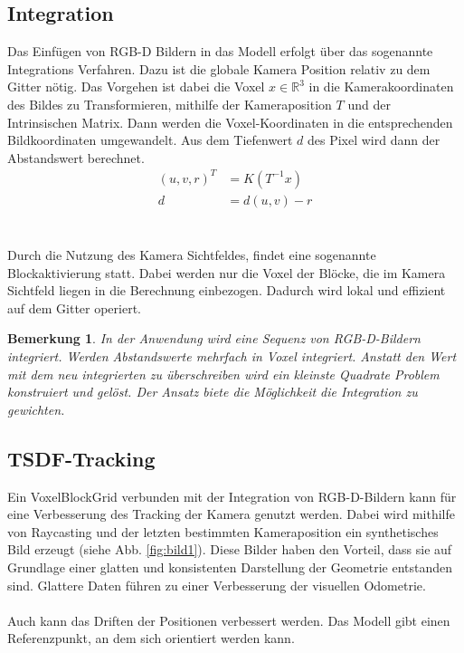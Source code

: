 \documentclass[12pt,DIV=15,BCOR=15mm,twoside,headsepline,abstract=true,listof=totoc,bibliography=totoc]{scrreprt}
\newtheorem{remark}{Bemerkung}[chapter]
\theoremstyle{remark}    %
\begin{document}
    \subsection{Integration}
    \label{sec:integration}
    Das Einfügen von \ac{RGB-D} Bildern in das Modell erfolgt über das sogenannte Integrations Verfahren. Dazu ist die globale Kamera Position relativ zu dem 
    Gitter nötig. Das Vorgehen ist dabei die Voxel $x\in \mathbb{R}^3$ in die Kamerakoordinaten des Bildes zu Transformieren, mithilfe der Kameraposition $T$ 
    und der Intrinsischen Matrix. Dann werden die Voxel-Koordinaten in die entsprechenden Bildkoordinaten umgewandelt. Aus dem Tiefenwert $d$ des Pixel wird 
    dann der Abstandswert berechnet. \cite{dong2023ashmodernframeworkparallel}
    \begin{align}
        \left( u,v,r \right)^T & = K(T^{-1}x) \\
       d  &= d(u, v) -r
    \end{align} \\\\
    Durch die Nutzung des Kamera Sichtfeldes, findet eine sogenannte Blockaktivierung statt. Dabei werden nur die Voxel der Blöcke, die im Kamera Sichtfeld liegen
    in die Berechnung einbezogen. Dadurch wird lokal und effizient auf dem Gitter operiert.
    \begin{remark} \label{bem:weight_integration}
    In der Anwendung wird eine Sequenz von \ac{RGB-D}-Bildern integriert. Werden Abstandswerte mehrfach in Voxel integriert. Anstatt den
    Wert mit dem neu integrierten zu überschreiben wird ein kleinste Quadrate Problem konstruiert und gelöst. Der Ansatz biete die Möglichkeit 
    die Integration zu gewichten. \cite{dong2023ashmodernframeworkparallel}
    \end{remark}

    \subsection{TSDF-Tracking}
    Ein VoxelBlockGrid verbunden mit der Integration von \ac{RGB-D}-Bildern kann für eine Verbesserung des Tracking der Kamera genutzt werden. Dabei wird mithilfe 
    von Raycasting und der letzten bestimmten Kameraposition ein synthetisches Bild erzeugt (siehe Abb. \ref{fig:bild1}). Diese Bilder haben den Vorteil, dass sie auf Grundlage einer glatten
    und konsistenten Darstellung der Geometrie entstanden sind. Glattere Daten führen zu einer Verbesserung der visuellen Odometrie. \\\\
    Auch kann das Driften der Positionen verbessert werden. Das Modell gibt einen Referenzpunkt, an dem sich orientiert werden kann.\cite{Zhou2018}
\end{document}
